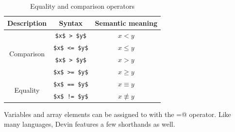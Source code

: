 \documentclass[UdineBachThesis,american,11pt,draft]{PhdThesis}
\begin{document}
  \begin{table}[h]
    \centering

    \begin{tabular}{|c|c|c|}
      \hline

      Description &
      Syntax &
      Semantic meaning \\
      \hline

      \multirow{4}{*}{Comparison} &
      \lstinline[mathescape]@$x$ > $y$@ &
      $x < y$ \\

      &
      \lstinline[mathescape]@$x$ <= $y$@ &
      $x \leq y$ \\

      &
      \lstinline[mathescape]@$x$ > $y$@ &
      $x > y$ \\

      &
      \lstinline[mathescape]@$x$ >= $y$@ &
      $x \geq y$ \\

      \multirow{2}{*}{Equality} &
      \lstinline[mathescape]@$x$ == $y$@ &
      $x \equiv y$ \\

      &
      \lstinline[mathescape]@$x$ != $y$@ &
      $x \not\equiv y$ \\
      \hline
    \end{tabular}

    \caption{Equality and comparison operators}
  \end{table}

  Variables and array elements can be assigned to with the \lstinline@=@
  operator. Like many languages, Devin features a few shorthands as well.
\end{document}
